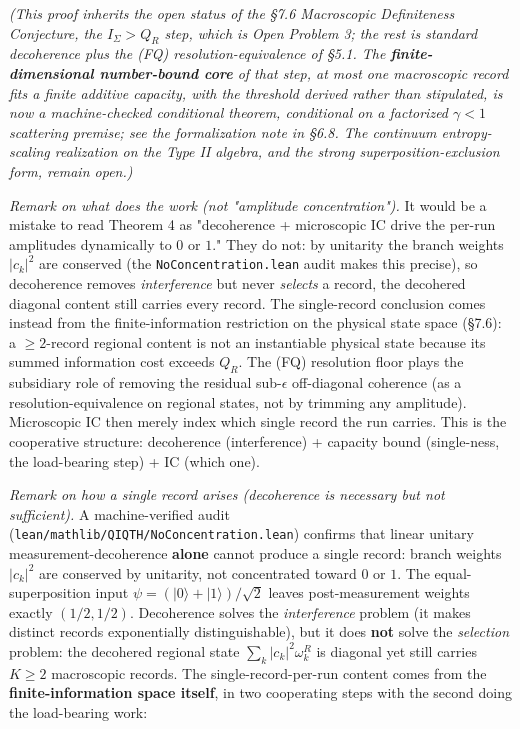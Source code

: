 \documentclass[11pt,a4paper]{article}
\begin{document}
\emph{(This proof inherits the open status of the §7.6 Macroscopic Definiteness Conjecture, the $I_\Sigma > Q_R$ step, which is Open Problem 3; the rest is standard decoherence plus the (FQ) resolution-equivalence of §5.1. The \textbf{finite-dimensional number-bound core} of that step, at most one macroscopic record fits a finite additive capacity, with the threshold derived rather than stipulated, is now a machine-checked conditional theorem, conditional on a factorized $\gamma<1$ scattering premise; see the formalization note in §6.8. The continuum entropy-scaling realization on the Type II algebra, and the strong superposition-exclusion form, remain open.)}

\emph{Remark on what does the work (not "amplitude concentration").} It would be a mistake to read Theorem 4 as "decoherence + microscopic IC drive the per-run amplitudes dynamically to $0$ or $1$." They do not: by unitarity the branch weights $|c_k|^2$ are conserved (the \texttt{NoConcentration.lean} audit makes this precise), so decoherence removes \emph{interference} but never \emph{selects} a record, the decohered diagonal content still carries every record. The single-record conclusion comes instead from the finite-information restriction on the physical state space (§7.6): a $\ge 2$-record regional content is not an instantiable physical state because its summed information cost exceeds $Q_R$. The (FQ) resolution floor plays the subsidiary role of removing the residual sub-$\epsilon$ off-diagonal coherence (as a resolution-equivalence on regional states, not by trimming any amplitude). Microscopic IC then merely index which single record the run carries. This is the cooperative structure: decoherence (interference) + capacity bound (single-ness, the load-bearing step) + IC (which one).

\emph{Remark on how a single record arises (decoherence is necessary but not sufficient).} A machine-verified audit (\texttt{lean/mathlib/QIQTH/NoConcentration.lean}) confirms that linear unitary measurement-decoherence \textbf{alone} cannot produce a single record: branch weights $|c_k|^2$ are conserved by unitarity, not concentrated toward $0$ or $1$. The equal-superposition input $\psi = (|0\rangle + |1\rangle)/\sqrt{2}$ leaves post-measurement weights exactly $(1/2, 1/2)$. Decoherence solves the \emph{interference} problem (it makes distinct records exponentially distinguishable), but it does \textbf{not} solve the \emph{selection} problem: the decohered regional state $\sum_k |c_k|^2 \omega_k^R$ is diagonal yet still carries $K \ge 2$ macroscopic records. The single-record-per-run content comes from the \textbf{finite-information space itself}, in two cooperating steps with the second doing the load-bearing work:
\end{document}
